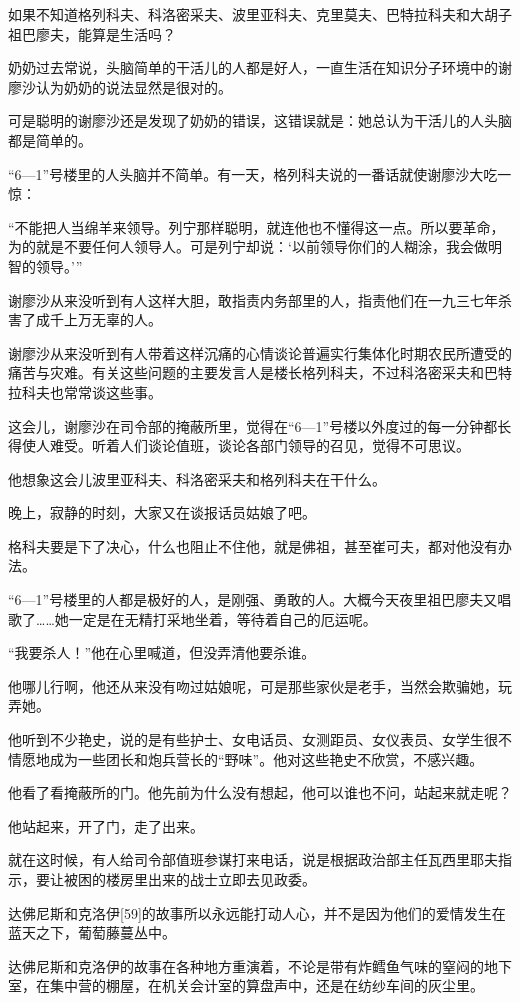 如果不知道格列科夫、科洛密采夫、波里亚科夫、克里莫夫、巴特拉科夫和大胡子祖巴廖夫，能算是生活吗？

奶奶过去常说，头脑简单的干活儿的人都是好人，一直生活在知识分子环境中的谢廖沙认为奶奶的说法显然是很对的。

可是聪明的谢廖沙还是发现了奶奶的错误，这错误就是：她总认为干活儿的人头脑都是简单的。

“6—1”号楼里的人头脑并不简单。有一天，格列科夫说的一番话就使谢廖沙大吃一惊：

“不能把人当绵羊来领导。列宁那样聪明，就连他也不懂得这一点。所以要革命，为的就是不要任何人领导人。可是列宁却说：‘以前领导你们的人糊涂，我会做明智的领导。’”

谢廖沙从来没听到有人这样大胆，敢指责内务部里的人，指责他们在一九三七年杀害了成千上万无辜的人。

谢廖沙从来没听到有人带着这样沉痛的心情谈论普遍实行集体化时期农民所遭受的痛苦与灾难。有关这些问题的主要发言人是楼长格列科夫，不过科洛密采夫和巴特拉科夫也常常谈这些事。

这会儿，谢廖沙在司令部的掩蔽所里，觉得在“6—1”号楼以外度过的每一分钟都长得使人难受。听着人们谈论值班，谈论各部门领导的召见，觉得不可思议。

他想象这会儿波里亚科夫、科洛密采夫和格列科夫在干什么。

晚上，寂静的时刻，大家又在谈报话员姑娘了吧。

格科夫要是下了决心，什么也阻止不住他，就是佛祖，甚至崔可夫，都对他没有办法。

“6—1”号楼里的人都是极好的人，是刚强、勇敢的人。大概今天夜里祖巴廖夫又唱歌了……她一定是在无精打采地坐着，等待着自己的厄运呢。

“我要杀人！”他在心里喊道，但没弄清他要杀谁。

他哪儿行啊，他还从来没有吻过姑娘呢，可是那些家伙是老手，当然会欺骗她，玩弄她。

他听到不少艳史，说的是有些护士、女电话员、女测距员、女仪表员、女学生很不情愿地成为一些团长和炮兵营长的“野味”。他对这些艳史不欣赏，不感兴趣。

他看了看掩蔽所的门。他先前为什么没有想起，他可以谁也不问，站起来就走呢？

他站起来，开了门，走了出来。

就在这时候，有人给司令部值班参谋打来电话，说是根据政治部主任瓦西里耶夫指示，要让被困的楼房里出来的战士立即去见政委。

达佛尼斯和克洛伊[59]的故事所以永远能打动人心，并不是因为他们的爱情发生在蓝天之下，葡萄藤蔓丛中。

达佛尼斯和克洛伊的故事在各种地方重演着，不论是带有炸鳕鱼气味的窒闷的地下室，在集中营的棚屋，在机关会计室的算盘声中，还是在纺纱车间的灰尘里。

